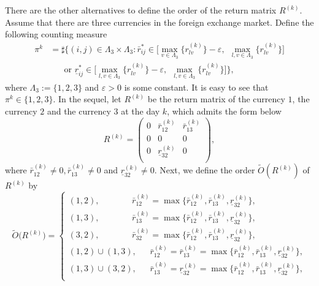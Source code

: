 \documentclass[11pt]{article}
\numberwithin{equation}{section}
\begin{document}
\begin{rem}
{\rm There are the other alternatives to define the order of the return matrix $R^{(k)}$. Assume that there are three currencies in the foreign exchange market.  
Define the following counting measure
\begin{equation}\label{on}
\begin{split}
\pi^{k}&=\sharp\Big\{(i,j)\in \Lambda_3\times\Lambda_3: \bar r_{ij}^*\in\Big[ \max_{v\in\Lambda_3}\{r_{lv}^{(k)}\}-\varepsilon,
~~\max_{l,v\in\Lambda_3}\{r_{lv}^{(k)}\} \Big] \\
&~~~~~~\mbox{ or } \underline r_{ij}^*\in\Big[
\max_{l,v\in\Lambda_3}\{r_{lv}^{(k)}\}-\varepsilon,
~~\max_{l,v\in\Lambda_3}\{r_{lv}^{(k)}\} \Big]  \Big\},
\end{split}
\end{equation}
where $\Lambda_3:=\{1,2,3\}$ and $\varepsilon>0$ is some constant. It is easy to see that $\pi^{k}\in \{1,2,3\}$. In the sequel, let $R^{(k)}$ be the return matrix of the currency $1$, the currency $2$ and the currency $3$ at the day $k$, which admits the form below
\begin{equation}\label{example}
R^{(k)}=\left(\begin{array}{ccccc}
        0 & \bar r_{12}^{(k)}& \bar r_{13}^{(k)}\\
        0 & 0&0\\
        0&\underline  r_{32}^{(k)}&0\\
        \end{array}
        \right),
\end{equation}
where $\bar r_{12}^{(k)}\neq0, \bar r_{13}^{(k)}\neq0$ and $\underline r_{32}^{(k)}\neq0$. Next, we define the order $\tilde
O(R^{(k)})$ of $R^{(k)}$ by
\begin{equation}\label{Duonao}
\tilde O\Big(R^{(k)}\Big)=
\begin{cases}
(1,2),~~~~~~~~~~~~~~~~~\bar r_{12}^{(k)}=\max\{\bar r_{12}^{(k)}, \bar r_{13}^{(k)},\underline r_{32}^{(k)}\},\\
(1,3),~~~~~~~~~~~~~~~~~\bar r_{13}^{(k)}=\max\{\bar r_{12}^{(k)}, \bar r_{13}^{(k)},\underline r_{32}^{(k)}\},\\
(3,2),~~~~~~~~~~~~~~~~~\bar r_{32}^{(k)}=\max\{\bar r_{12}^{(k)}, \bar r_{13}^{(k)},\underline r_{32}^{(k)}\},\\
(1,2)\cup(1,3),~~~~~~~\bar r_{12}^{(k)}=\bar r_{13}^{(k)}=\max\{\bar r_{12}^{(k)}, \bar r_{13}^{(k)},\underline r_{32}^{(k)}\},\\
(1,3)\cup(3,2),~~~~~~~\bar r_{13}^{(k)}=\underline r_{32}^{(k)}=\max\{\bar r_{12}^{(k)}, \bar r_{13}^{(k)},\underline r_{32}^{(k)}\},\\

\end{cases}
\end{equation}}
\end{rem}
\end{document}
